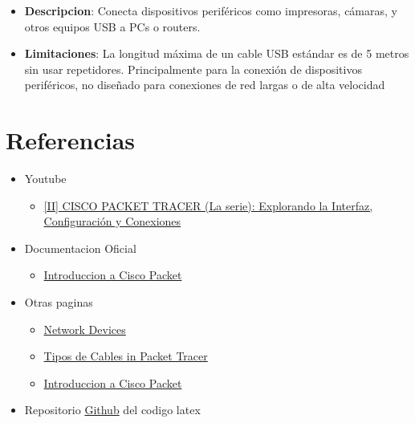 \documentclass{article}
\begin{document}
\begin{itemize}
                \begin{itemize}
                    \item\textbf{Descripcion}:
                    Conecta dispositivos periféricos como impresoras, cámaras, y otros equipos USB a PCs o routers.
                    \item\textbf{Limitaciones}:
                    La longitud máxima de un cable USB estándar es de 5 metros sin usar repetidores.
                    Principalmente para la conexión de dispositivos periféricos, no diseñado para conexiones de red largas o de alta velocidad
                \end{itemize} 
        \end{itemize}
        
    \section{Referencias}
        \begin{itemize}
            \item Youtube
                \begin{itemize} 
                \item \href{https://www.youtube.com/watch?v=lso8MPblUZY&list=PLINy58Bvq5_IV5dhYqGy500vSTCIHUkS1&index=4}{[II] CISCO PACKET TRACER (La serie): Explorando la Interfaz, Configuración y Conexiones}
                \end{itemize}
            \item Documentacion Oficial
                \begin{itemize} 
                \item \href{https://skillsforall.com/es/course/getting-started-cisco-packet-tracer?courseLang=es-XL}{Introduccion a Cisco Packet}            
                \end{itemize}
            \item Otras paginas
            \begin{itemize} 
                \item \href{https://ipcisco.com/lesson/network-devices-2/}{Network Devices}
                \item  \href{https://ccnatutorials.in/packet-tracer/types-of-cables-in-packet-tracer/}{Tipos de Cables in Packet Tracer}
                \item \href{ https://learningnetwork.cisco.com/s/article/el-software-de-simulacion-cisco-packet-tracer}{Introduccion a Cisco Packet}
            \end{itemize}
            \item Repositorio \href{https://github.com/nardo96hub/Redes1/}{Github} del codigo latex
            
        \end{itemize}
\end{document}
